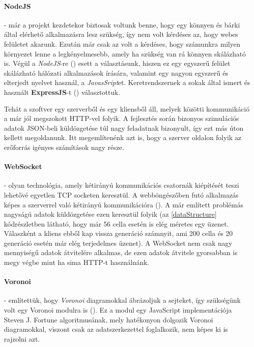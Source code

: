 \paragraph{NodeJS} - már a projekt kezdetekor biztosak voltunk benne, hogy egy könnyen és bárki által elérhető alkalmazásra lesz szükség, így nem volt kérdéses az, hogy webes felületet akarunk. Ezután már csak az volt a kérdéses, hogy számunkra milyen környezet lenne a legkényelmesebb, amely ha szükség van rá könnyen skálázható is. Végül a \textit{NodeJS}-re (\cite{soft:node}) esett a választásunk, hiszen ez egy egyszerű felület skálázható hálózati alkalmazások írására, valamint egy nagyon egyszerű és elterjedt nyelvet használ, a \textit{JavasSript}et. Keretrendszernek a sokak által ismert és használt \textbf{ExpressJS}-t (\cite{soft:express}) választottuk.

Tehát a szoftver egy szerverből és egy kliensből áll, melyek közötti kommunikáció a már jól megszokott HTTP-vel folyik. A fejlesztés során bizonyos szimulációs adatok JSON-beli küldözgetése túl nagy feladatnak bizonyult, így ezt más úton kellett megoldanunk. Itt megemlítenénk azt is, hogy a szerver oldalon folyik az erőforrás igényes számítások nagy része.

\paragraph{WebSocket} - olyan technológia, amely kétirányú kommunikációs csatornák kiépítését teszi lehetővé egyetlen TCP socketen keresztül. A webböngészőben futó alkalmazás képes a szerverrel való kétirányú kommunikációra (\cite{wiki:Websocket}). A már említett problémás nagyságú adatok küldözgetése ezen keresztül folyik (az \ref{dataStructure} kódrészletben látható, hogy már 56 cella esetén is elég méretes egy üzenet. Válaszként a kliens ebből kap vissza generáció számnyit, ami 200 cella és 20 generáció esetén már elég terjedelmes üzenet). A WebSocket nem csak nagy mennyiségű adatok átvitelére alkalmas, de ezen adatok átvitele gyorsabban is megy végbe mint ha sima HTTP-t használnánk.

\paragraph{Voronoi} - említettük, hogy \textit{Voronoi} diagramokkal ábrázoljuk a sejteket, így szükségünk volt egy Voronoi modulra is (\cite{soft:voronoiModule}). Ez a modul egy JavaScript implementációja Steven J. Fortune algoritmusának, mely hatékonyon dolgozik Voronoi diagramokkal, viszont csak az adatszerkezettel foglalkozik, nem képes ki is rajzolni azt.

